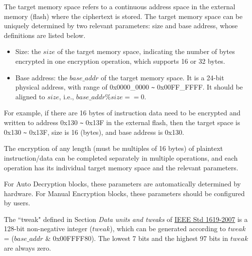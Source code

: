 \documentclass[main\_\_EN.tex]{subfiles}
\begin{document}
The target memory space refers to a continuous address space in the external memory (flash) where the ciphertext is stored. The target memory space can be uniquely determined by two relevant parameters: size and base address, whose definitions are listed below.

\begin{itemize}
    \item Size: the \begin{math} size \end{math} of the target memory space, indicating the number of bytes encrypted in one encryption operation, which supports 16 or 32 bytes.
    \item Base address: the \begin{math} base\_addr\end{math} of the target memory space. It is a 24-bit physical address, with range of 0x0000\_0000 \verb+~+ 0x00FF\_FFFF. It should be aligned to \begin{math} size \end{math}, i.e., \begin{math} base\_addr \% size == 0 \end{math}.
\end{itemize}

For example, if there are 16 bytes of instruction data need to be encrypted and written to address 0x130 \verb+~+ 0x13F in the external flash, then the target space is 0x130 \verb+~+ 0x13F, size is 16 (bytes), and base address is 0x130.

The encryption of any length (must be multiples of 16 bytes) of plaintext instruction/data can be completed separately in multiple operations, and each operation has its individual target memory space and the relevant parameters.

For Auto Decryption blocks, these parameters are automatically determined by hardware. For Manual Encryption blocks, these parameters should be configured by users.

\begin{tiplisting}
\vspace{-2em}
\begin{enumerate}
    The ``tweak" defined in Section \textit{Data units and tweaks} of \href{https://ieeexplore.ieee.org/document/4493450}{IEEE Std 1619-2007} is a 128-bit non-negative integer (\begin{math} tweak \end{math}), which can be generated according to \begin{math} tweak \end{math} = (\begin{math} base\_addr \end{math} \& 0x00FFFF80). The lowest 7 bits and the highest 97 bits in \begin{math} tweak \end{math} are always zero.
\end{enumerate}
\end{tiplisting}
\end{document}

